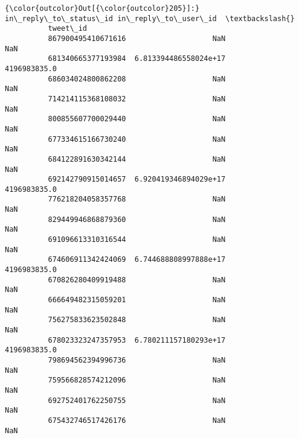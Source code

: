 \documentclass[11pt]{article}
\begin{document}
\begin{Verbatim}[commandchars=\\\{\}]
{\color{outcolor}Out[{\color{outcolor}205}]:}                     in\_reply\_to\_status\_id in\_reply\_to\_user\_id  \textbackslash{}
          tweet\_id                                                        
          867900495410671616                    NaN                 NaN   
          681340665377193984  6.813394486558024e+17        4196983835.0   
          686034024800862208                    NaN                 NaN   
          714214115368108032                    NaN                 NaN   
          800855607700029440                    NaN                 NaN   
          677334615166730240                    NaN                 NaN   
          684122891630342144                    NaN                 NaN   
          692142790915014657  6.920419346894029e+17        4196983835.0   
          776218204058357768                    NaN                 NaN   
          829449946868879360                    NaN                 NaN   
          691096613310316544                    NaN                 NaN   
          674606911342424069  6.744688808997888e+17        4196983835.0   
          670826280409919488                    NaN                 NaN   
          666649482315059201                    NaN                 NaN   
          756275833623502848                    NaN                 NaN   
          678023323247357953  6.780211157180293e+17        4196983835.0   
          798694562394996736                    NaN                 NaN   
          759566828574212096                    NaN                 NaN   
          692752401762250755                    NaN                 NaN   
          675432746517426176                    NaN                 NaN   
          

\end{Verbatim}
\end{document}
